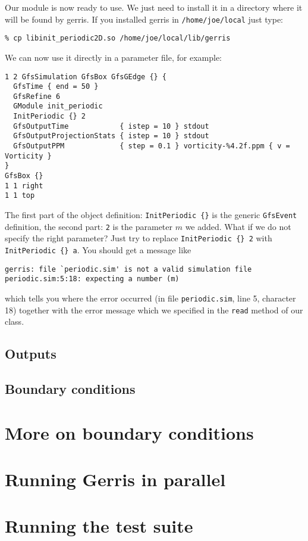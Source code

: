 \documentclass[a4paper]{article}
\begin{document}
Our module is now ready to use. We just need to install it in a
directory where it will be found by gerris. If you installed gerris in 
{\tt /home/joe/local} just type:
\begin{verbatim}
% cp libinit_periodic2D.so /home/joe/local/lib/gerris
\end{verbatim}
We can now use it directly in a parameter file, for example:
\begin{verbatim}
1 2 GfsSimulation GfsBox GfsGEdge {} {
  GfsTime { end = 50 }
  GfsRefine 6
  GModule init_periodic
  InitPeriodic {} 2
  GfsOutputTime            { istep = 10 } stdout
  GfsOutputProjectionStats { istep = 10 } stdout
  GfsOutputPPM             { step = 0.1 } vorticity-%4.2f.ppm { v = Vorticity }
}
GfsBox {}
1 1 right
1 1 top
\end{verbatim}
The first part of the object definition: {\tt InitPeriodic \{\}} is the
generic {\tt GfsEvent} definition, the second part: {\tt 2} is the
parameter $m$ we added. What if we do not specify the right parameter?
Just try to replace {\tt InitPeriodic \{\} 2} with {\tt InitPeriodic
\{\} a}. You should get a message like
\begin{verbatim}
gerris: file `periodic.sim' is not a valid simulation file
periodic.sim:5:18: expecting a number (m)
\end{verbatim}
which tells you where the error occurred (in file {\tt periodic.sim},
line 5, character 18) together with the error message which we
specified in the {\tt read} method of our class.

\subsection{Outputs}

\subsection{Boundary conditions}

\section{More on boundary conditions}

\section{Running Gerris in parallel}

\section{Running the test suite}
\end{document}
